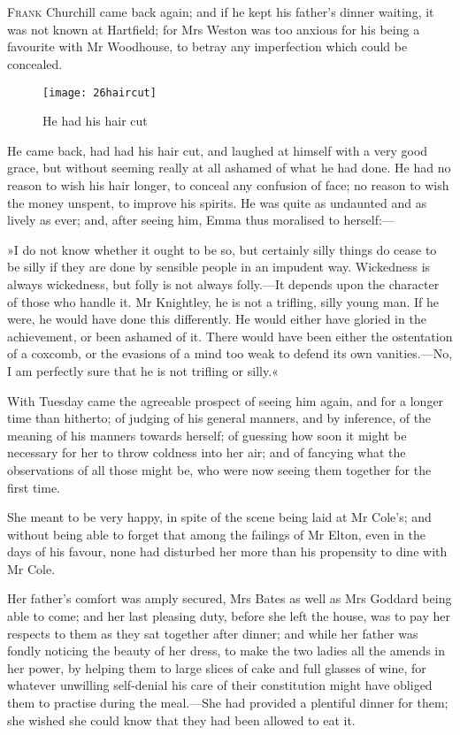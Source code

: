 \chapter[Chapter \thechapter]{}
\lettrine[lines=4,lraise=0.3]{F}{rank} Churchill came back again; and if he kept his father's dinner waiting, it was not known at Hartfield; for Mrs Weston was too anxious for his being a favourite with Mr Woodhouse, to betray any imperfection which could be concealed.

\begin{figure}[tbph]
\centering
\texttt{[image: 26haircut]}
\caption{He had his hair cut}
\end{figure}

He came back, had had his hair cut, and laughed at himself with a very good grace, but without seeming really at all ashamed of what he had done. He had no reason to wish his hair longer, to conceal any confusion of face; no reason to wish the money unspent, to improve his spirits. He was quite as undaunted and as lively as ever; and, after seeing him, Emma thus moralised to herself:—

»I do not know whether it ought to be so, but certainly silly things do cease to be silly if they are done by sensible people in an impudent way. Wickedness is always wickedness, but folly is not always folly.—It depends upon the character of those who handle it. Mr Knightley, he is not a trifling, silly young man. If he were, he would have done this differently. He would either have gloried in the achievement, or been ashamed of it. There would have been either the ostentation of a coxcomb, or the evasions of a mind too weak to defend its own vanities.—No, I am perfectly sure that he is not trifling or silly.«

With Tuesday came the agreeable prospect of seeing him again, and for a longer time than hitherto; of judging of his general manners, and by inference, of the meaning of his manners towards herself; of guessing how soon it might be necessary for her to throw coldness into her air; and of fancying what the observations of all those might be, who were now seeing them together for the first time.

She meant to be very happy, in spite of the scene being laid at Mr Cole's; and without being able to forget that among the failings of Mr Elton, even in the days of his favour, none had disturbed her more than his propensity to dine with Mr Cole.

Her father's comfort was amply secured, Mrs Bates as well as Mrs Goddard being able to come; and her last pleasing duty, before she left the house, was to pay her respects to them as they sat together after dinner; and while her father was fondly noticing the beauty of her dress, to make the two ladies all the amends in her power, by helping them to large slices of cake and full glasses of wine, for whatever unwilling self-denial his care of their constitution might have obliged them to practise during the meal.—She had provided a plentiful dinner for them; she wished she could know that they had been allowed to eat it.

